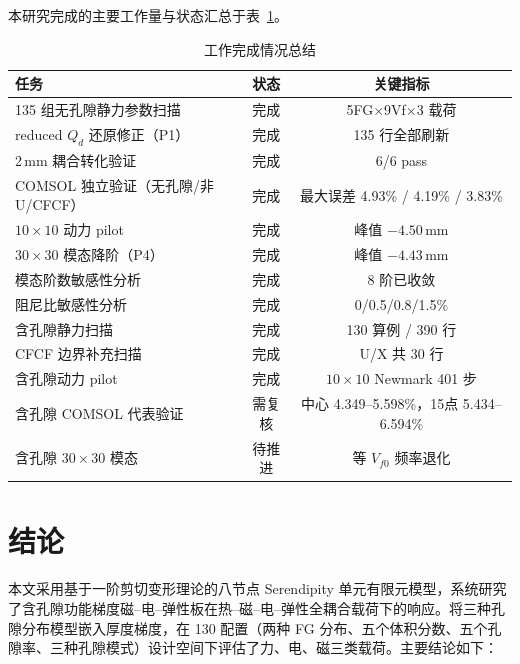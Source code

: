 \documentclass[11pt,a4paper]{ctexart}
\begin{document}
本研究完成的主要工作量与状态汇总于表~\ref{tab:summary}。

\begin{table}[H]
\centering
\caption{工作完成情况总结}
\label{tab:summary}
\begin{tabular}{p{5cm}cc}
\toprule
\textbf{任务} & \textbf{状态} & \textbf{关键指标} \\
\midrule
135 组无孔隙静力参数扫描 & \textcolor{passgreen}{完成} & 5FG$\times$9Vf$\times$3 载荷 \\
reduced $Q_d$ 还原修正（P1） & \textcolor{passgreen}{完成} & 135 行全部刷新 \\
2\,mm 耦合转化验证 & \textcolor{passgreen}{完成} & 6/6 pass \\
COMSOL 独立验证（无孔隙/非U/CFCF） & \textcolor{passgreen}{完成} & 最大误差 4.93\% / 4.19\% / 3.83\% \\
$10\times10$ 动力 pilot & \textcolor{passgreen}{完成} & 峰值 $-4.50$\,mm \\
$30\times30$ 模态降阶（P4） & \textcolor{passgreen}{完成} & 峰值 $-4.43$\,mm \\
模态阶数敏感性分析 & \textcolor{passgreen}{完成} & 8 阶已收敛 \\
阻尼比敏感性分析 & \textcolor{passgreen}{完成} & 0/0.5/0.8/1.5\% \\
含孔隙静力扫描 & \textcolor{passgreen}{完成} & 130 算例 / 390 行 \\
CFCF 边界补充扫描 & \textcolor{passgreen}{完成} & U/X 共 30 行 \\
含孔隙动力 pilot & \textcolor{passgreen}{完成} & $10\times10$ Newmark 401 步 \\
\midrule
含孔隙 COMSOL 代表验证 & \textcolor{warnblue}{需复核} & 中心 4.349--5.598\%，15点 5.434--6.594\% \\
含孔隙 $30\times30$ 模态 & \textcolor{warnblue}{待推进} & 等 $V_{f0}$ 频率退化 \\
\bottomrule
\end{tabular}
\end{table}

\section{结论}

本文采用基于一阶剪切变形理论的八节点 Serendipity 单元有限元模型，系统研究了含孔隙功能梯度磁--电--弹性板在热--磁--电--弹性全耦合载荷下的响应。将三种孔隙分布模型嵌入厚度梯度，在 130 配置（两种 FG 分布、五个体积分数、五个孔隙率、三种孔隙模式）设计空间下评估了力、电、磁三类载荷。主要结论如下：
\end{document}
